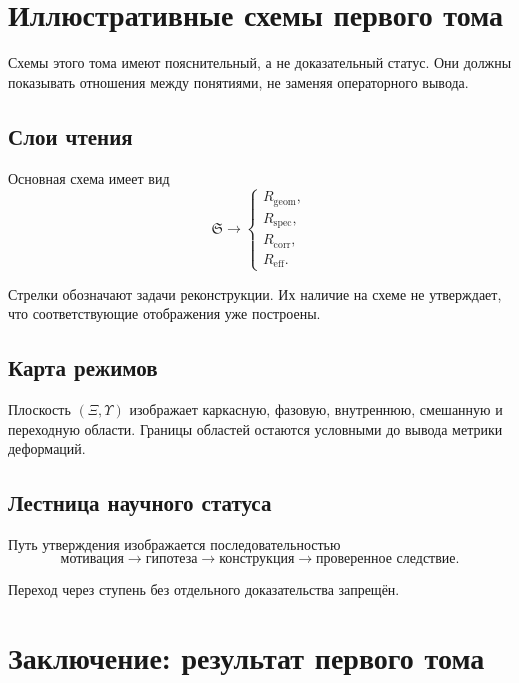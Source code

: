 \chapter{Иллюстративные схемы первого тома}

Схемы этого тома имеют пояснительный, а не доказательный статус. Они должны
показывать отношения между понятиями, не заменяя операторного вывода.

\section{Слои чтения}

Основная схема имеет вид
\begin{equation}
 \mathfrak S
 \longrightarrow
 \begin{cases}
  R_{\mathrm{geom}},\\
  R_{\mathrm{spec}},\\
  R_{\mathrm{corr}},\\
  R_{\mathrm{eff}}.
 \end{cases}
\end{equation}

Стрелки обозначают задачи реконструкции. Их наличие на схеме не утверждает,
что соответствующие отображения уже построены.

\section{Карта режимов}

Плоскость $(\Xi,\Upsilon)$ изображает каркасную, фазовую, внутреннюю,
смешанную и переходную области. Границы областей остаются условными до вывода
метрики деформаций.

\section{Лестница научного статуса}

Путь утверждения изображается последовательностью
\begin{equation}
 \text{мотивация}\longrightarrow
 \text{гипотеза}\longrightarrow
 \text{конструкция}\longrightarrow
 \text{проверенное следствие}.
\end{equation}

Переход через ступень без отдельного доказательства запрещён.

\chapter{Заключение: результат первого тома}

